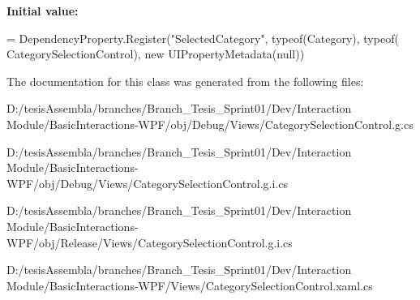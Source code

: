 {\bfseries Initial value\-:}
\begin{DoxyCode}
=
            DependencyProperty.Register(\textcolor{stringliteral}{"SelectedCategory"}, typeof(Category), typeof(
      CategorySelectionControl), \textcolor{keyword}{new} UIPropertyMetadata(null))
\end{DoxyCode}


The documentation for this class was generated from the following files\-:\begin{DoxyCompactItemize}
\item 
D\-:/tesis\-Assembla/branches/\-Branch\-\_\-\-Tesis\-\_\-\-Sprint01/\-Dev/\-Interaction Module/\-Basic\-Interactions-\/\-W\-P\-F/obj/\-Debug/\-Views/Category\-Selection\-Control.\-g.\-cs\item 
D\-:/tesis\-Assembla/branches/\-Branch\-\_\-\-Tesis\-\_\-\-Sprint01/\-Dev/\-Interaction Module/\-Basic\-Interactions-\/\-W\-P\-F/obj/\-Debug/\-Views/Category\-Selection\-Control.\-g.\-i.\-cs\item 
D\-:/tesis\-Assembla/branches/\-Branch\-\_\-\-Tesis\-\_\-\-Sprint01/\-Dev/\-Interaction Module/\-Basic\-Interactions-\/\-W\-P\-F/obj/\-Release/\-Views/Category\-Selection\-Control.\-g.\-i.\-cs\item 
D\-:/tesis\-Assembla/branches/\-Branch\-\_\-\-Tesis\-\_\-\-Sprint01/\-Dev/\-Interaction Module/\-Basic\-Interactions-\/\-W\-P\-F/\-Views/Category\-Selection\-Control.\-xaml.\-cs\end{DoxyCompactItemize}
